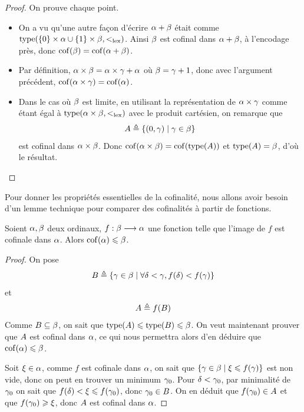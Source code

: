 \begin{proof}
  On prouve chaque point.
  \begin{itemize}
  \item On a vu qu'une autre façon d'écrire $\alpha + \beta$ était comme
    $\operatorname{type}(\{0\}\times\alpha \cup \{1\}\times\beta, <_{\mathrm{lex}})$. Ainsi $\beta$ est
    cofinal dans $\alpha + \beta$, à l'encodage près, donc
    $\operatorname{cof}(\beta) = \operatorname{cof}(\alpha + \beta)$.
  \item Par définition, $\alpha \times \beta = \alpha \times \gamma + \alpha$
    où $\beta = \gamma + 1$, donc avec l'argument précédent,
    $\operatorname{cof}(\alpha\times\gamma) = \operatorname{cof}(\alpha)$.
  \item Dans le cas où $\beta$ est limite, en utilisant la représentation de
    $\alpha \times \gamma$ comme étant égal à
    $\operatorname{type}(\alpha\times\beta,\mathord{<_{\mathrm{lex}}})$
    avec le produit cartésien, on remarque que
    \[A \triangleq \left\{ (0,\gamma) \;\middle\vert\; \gamma \in \beta \right\}\]
    est cofinal dans $\alpha \times \beta$. Donc
    $\operatorname{cof}(\alpha\times \beta) = \operatorname{cof}(\operatorname{type}(A))$ et
    $\operatorname{type}(A) = \beta$, d'où le résultat.\qedhere
  \end{itemize}
\end{proof}

Pour donner les propriétés essentielles de la cofinalité, nous allons avoir
besoin d'un lemme technique pour comparer des cofinalités à partir de fonctions.

\begin{proposition}\label{prop.cof.compar.surj}
  Soient $\alpha,\beta$ deux ordinaux, $f : \displaystyle \beta \longrightarrow \alpha$ une
  fonction telle que l'image de $f$ est cofinale dans $\alpha$. Alors
  $\operatorname{cof}(\alpha) \leqslant \beta$.
\end{proposition}

\begin{proof}
  On pose
  \[B \triangleq
  \left\{ \gamma \in \beta \;\middle\vert\; \forall \delta < \gamma, f(\delta) < f(\gamma) \right\}
    \]
  et
  \[A \triangleq f(B)\]
  Comme $B\subseteq \beta$, on sait que
  $\operatorname{type}(A)\leqslant \operatorname{type}(B) \leqslant \beta$.
  On veut maintenant prouver que $A$ est cofinal dans $\alpha$, ce qui nous
  permettra alors d'en déduire que $\operatorname{cof}(\alpha) \leqslant \beta$.

  Soit $\xi \in \alpha$, comme $f$ est cofinale dans $\alpha$, on sait que
  $\left\{ \gamma \in \beta \;\middle\vert\; \xi \leqslant f(\gamma) \right\}$ est non vide, donc on peut
  en trouver un minimum $\gamma_0$. Pour $\delta < \gamma_0$, par minimalité de
  $\gamma_0$ on sait que $f(\delta) < \xi\leqslant f(\gamma_0)$, donc
  $\gamma_0 \in B$. On en déduit que $f(\gamma_0)\in A$ et que
  $f(\gamma_0) \geqslant \xi$, donc $A$ est cofinal dans $\alpha$.
\end{proof}

